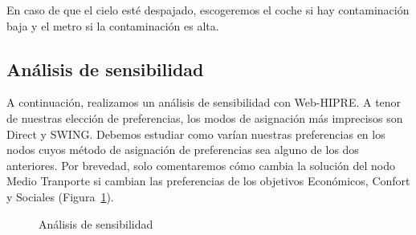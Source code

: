 \documentclass[12pt,a4paper,twoside,openright,titlepage,final]{article}
\begin{document}
En caso de que el cielo esté despajado, escogeremos el coche si hay contaminación baja y el metro si la contaminación es alta.\\

\subsection{Análisis de sensibilidad}

A continuación, realizamos un análisis de sensibilidad con Web-HIPRE. A tenor de nuestras elección de preferencias, los modos de asignación más imprecisos son Direct y SWING. Debemos estudiar como varían nuestras preferencias en los nodos cuyos método de asignación de preferencias sea alguno de los dos anteriores. Por brevedad, solo comentaremos cómo cambia la solución del nodo Medio Tranporte si cambian las preferencias de los objetivos Económicos, Confort y Sociales (Figura~\ref{fig:sensibilidad}).\\


\begin{figure}[htbp!]
\centering
{}
\caption{Análisis de sensibilidad} \label{fig:sensibilidad}
\end{figure}
\end{document}
